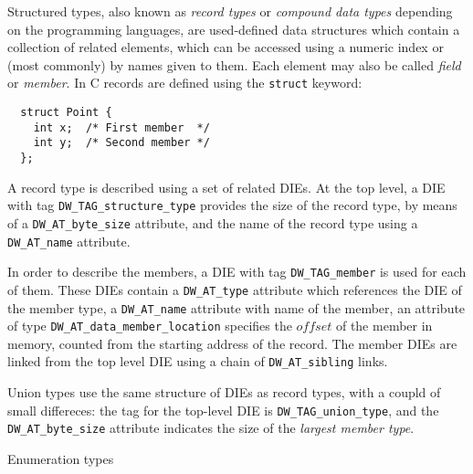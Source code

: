 Structured types, also known as \emph{record types} or \emph{compound data
types} depending on the programming languages, are used-defined data
structures which contain a collection of related elements, which can be
accessed using a numeric index or (most commonly) by names given to them. Each
element may also be called \emph{field} or \emph{member}. In C records are
defined using the \texttt{struct} keyword:

\begin{verbatim}
  struct Point {
    int x;  /* First member  */
    int y;  /* Second member */
  };
\end{verbatim}

A record type is described using a set of related DIEs. At the top level,
a DIE with tag \verb|DW_TAG_structure_type| provides the size of the record
type, by means of a \verb|DW_AT_byte_size| attribute, and the name of the
record type using a \verb|DW_AT_name| attribute.

In order to describe the members, a DIE with tag \verb|DW_TAG_member| is
used for each of them. These DIEs contain a \verb|DW_AT_type| attribute
which references the DIE of the member type, a \verb|DW_AT_name| attribute
with name of the member, an attribute of type
\verb|DW_AT_data_member_location| specifies the $ offset $ of the member in
memory, counted from the starting address of the record. The member DIEs are
linked from the top level DIE using a chain of \verb|DW_AT_sibling| links.



Union types use the same structure of DIEs as record types, with a coupld of
small differeces: the tag for the top-level DIE is \verb|DW_TAG_union_type|,
and the \verb|DW_AT_byte_size| attribute indicates the size of the
\emph{largest member type}.



Enumeration types 

